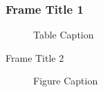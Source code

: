 \documentclass{article}
\begin{document}
\begin{frame}
\frametitle{Frame Title 1}
\begin{figure}
\begin{table}
\caption{Table Caption}
\end{table}
\end{figure}
\end{frame}
\begin{frame} {Frame Title 2}
\begin{figure}
\caption{Figure Caption}
\end{figure}
\end{frame}
\begin{frame}
\end{frame}
\end{document}
